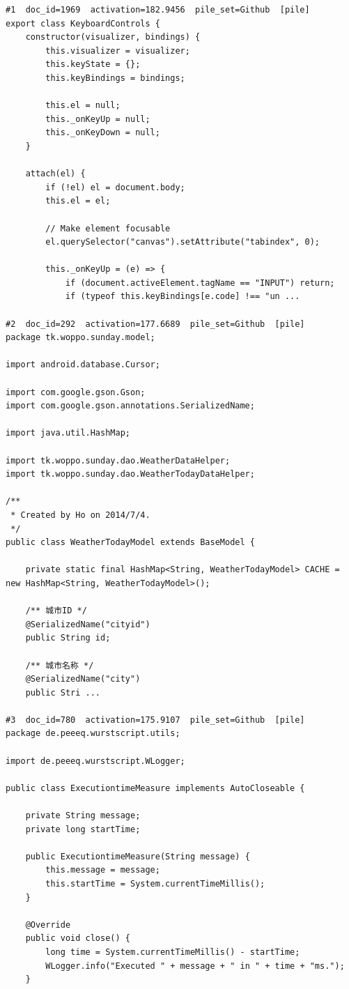 \begin{verbatim}
#1  doc_id=1969  activation=182.9456  pile_set=Github  [pile]
export class KeyboardControls {
    constructor(visualizer, bindings) {
        this.visualizer = visualizer;
        this.keyState = {};
        this.keyBindings = bindings;

        this.el = null;
        this._onKeyUp = null;
        this._onKeyDown = null;
    }

    attach(el) {
        if (!el) el = document.body;
        this.el = el;

        // Make element focusable
        el.querySelector("canvas").setAttribute("tabindex", 0);

        this._onKeyUp = (e) => {
            if (document.activeElement.tagName == "INPUT") return;
            if (typeof this.keyBindings[e.code] !== "un ...

#2  doc_id=292  activation=177.6689  pile_set=Github  [pile]
package tk.woppo.sunday.model;

import android.database.Cursor;

import com.google.gson.Gson;
import com.google.gson.annotations.SerializedName;

import java.util.HashMap;

import tk.woppo.sunday.dao.WeatherDataHelper;
import tk.woppo.sunday.dao.WeatherTodayDataHelper;

/**
 * Created by Ho on 2014/7/4.
 */
public class WeatherTodayModel extends BaseModel {

    private static final HashMap<String, WeatherTodayModel> CACHE = new HashMap<String, WeatherTodayModel>();

    /** 城市ID */
    @SerializedName("cityid")
    public String id;

    /** 城市名称 */
    @SerializedName("city")
    public Stri ...

#3  doc_id=780  activation=175.9107  pile_set=Github  [pile]
package de.peeeq.wurstscript.utils;

import de.peeeq.wurstscript.WLogger;

public class ExecutiontimeMeasure implements AutoCloseable {

    private String message;
    private long startTime;

    public ExecutiontimeMeasure(String message) {
        this.message = message;
        this.startTime = System.currentTimeMillis();
    }

    @Override
    public void close() {
        long time = System.currentTimeMillis() - startTime;
        WLogger.info("Executed " + message + " in " + time + "ms.");
    }


\end{verbatim}
